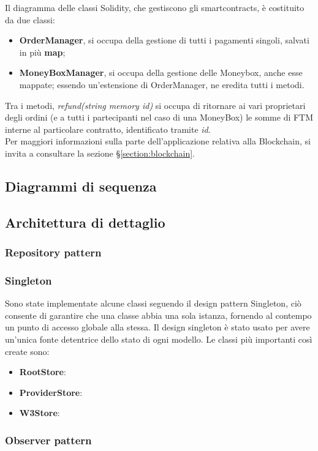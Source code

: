 Il diagramma delle classi Solidity, che gestiscono gli smartcontracts, è costituito da due classi:
\begin{itemize}
    \item \textbf{OrderManager}, si occupa della gestione di tutti i pagamenti singoli, salvati in più \textbf{map};
    \item \textbf{MoneyBoxManager}, si occupa della gestione delle Moneybox, anche esse mappate; essendo un'estensione di OrderManager, ne eredita tutti i metodi.
\end{itemize}
Tra i metodi, \textit{refund(string memory id)} si occupa di ritornare ai vari proprietari degli ordini 
(e a tutti i partecipanti nel caso di una MoneyBox) le somme di FTM interne al particolare contratto, identificato tramite \textit{id}.
\\
Per maggiori informazioni sulla parte dell'applicazione relativa alla Blockchain, si invita a consultare la sezione §\ref{section:blockchain}.



\subsection{Diagrammi di sequenza}

\subsection{Architettura di dettaglio}

\subsubsection{Repository pattern}



\subsubsection{Singleton}

Sono state implementate alcune classi seguendo il design pattern Singleton,
 ciò consente di garantire che una classe abbia una sola istanza, fornendo al contempo un punto di accesso globale alla stessa.
Il design singleton è stato usato per avere un'unica fonte detentrice dello stato di ogni modello.
Le classi più importanti così create sono:

\begin{itemize}
    \item \textbf{RootStore}: 
    \item \textbf{ProviderStore}:
    \item \textbf{W3Store}:
\end{itemize}

\subsubsection{Observer pattern}

